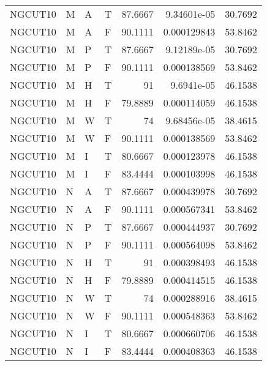 \begin{tabular}{llllrrr}
    NGCUT10  & M     & A     & T          & 87.6667    & 9.34601e-05 & 30.7692  \\
    NGCUT10  & M     & A     & F          & 90.1111    & 0.000129843 & 53.8462  \\
    NGCUT10  & M     & P     & T          & 87.6667    & 9.12189e-05 & 30.7692  \\
    NGCUT10  & M     & P     & F          & 90.1111    & 0.000138569 & 53.8462  \\
    NGCUT10  & M     & H     & T          & 91         & 9.6941e-05  & 46.1538  \\
    NGCUT10  & M     & H     & F          & 79.8889    & 0.000114059 & 46.1538  \\
    NGCUT10  & M     & W     & T          & 74         & 9.68456e-05 & 38.4615  \\
    NGCUT10  & M     & W     & F          & 90.1111    & 0.000138569 & 53.8462  \\
    NGCUT10  & M     & I     & T          & 80.6667    & 0.000123978 & 46.1538  \\
    NGCUT10  & M     & I     & F          & 83.4444    & 0.000103998 & 46.1538  \\
    NGCUT10  & N     & A     & T          & 87.6667    & 0.000439978 & 30.7692  \\
    NGCUT10  & N     & A     & F          & 90.1111    & 0.000567341 & 53.8462  \\
    NGCUT10  & N     & P     & T          & 87.6667    & 0.000444937 & 30.7692  \\
    NGCUT10  & N     & P     & F          & 90.1111    & 0.000564098 & 53.8462  \\
    NGCUT10  & N     & H     & T          & 91         & 0.000398493 & 46.1538  \\
    NGCUT10  & N     & H     & F          & 79.8889    & 0.000414515 & 46.1538  \\
    NGCUT10  & N     & W     & T          & 74         & 0.000288916 & 38.4615  \\
    NGCUT10  & N     & W     & F          & 90.1111    & 0.000548363 & 53.8462  \\
    NGCUT10  & N     & I     & T          & 80.6667    & 0.000660706 & 46.1538  \\
    NGCUT10  & N     & I     & F          & 83.4444    & 0.000408363 & 46.1538  \\
    \hline
\end{tabular}